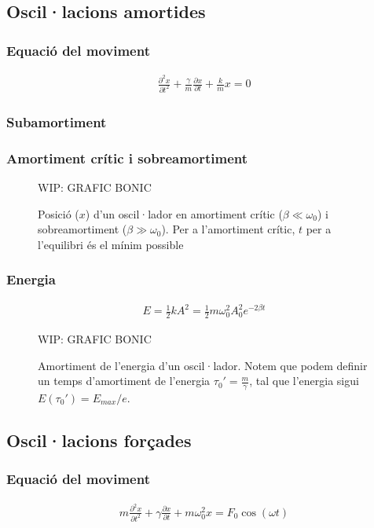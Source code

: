 \subsection{Oscil·lacions amortides}

\subsubsection*{Equació del moviment}
\begin{align}
    \boxed{\frac{\partial^{2} x}{\partial t^{2}} + \frac{\gamma}{m} \frac{\partial x}{\partial t} + \frac{k}{m} x = 0}
\end{align}

\subsubsection*{Subamortiment}

\subsubsection*{Amortiment crític i sobreamortiment}
\begin{figure}[H]
\centering
    WIP: GRAFIC BONIC 
\caption{Posició ($x$) d'un oscil·lador en amortiment crític ($\beta \ll \omega_{0}$) i sobreamortiment ($\beta \gg \omega_{0}$). Per a l'amortiment crític, $t$ per a l'equilibri és el mínim possible}
\end{figure}

\subsubsection*{Energia}
\begin{align}
    \boxed{E = \frac{1}{2} k A^{2} = \frac{1}{2} m \omega_{0}^{2} A_{0}^{2} e^{-2 \beta t}}
\end{align}
\begin{figure}[H]
\centering
    WIP: GRAFIC BONIC 
\caption{Amortiment de l'energia d'un oscil·lador. Notem que podem definir un temps d'amortiment de l'energia $\tau_{0}' = \frac{m}{\gamma}$, tal que l'energia sigui $E(\tau_{0}') = E_{max}/e$. }
\end{figure}

\subsection{Oscil·lacions forçades}

\subsubsection*{Equació del moviment}
\begin{align}
    \boxed{m \frac{\partial^{2} x}{\partial t^{2}} + \gamma \frac{\partial x}{\partial t} + m \omega_{0}^{2} x = F_{0} \cos (\omega t)}
\end{align}
